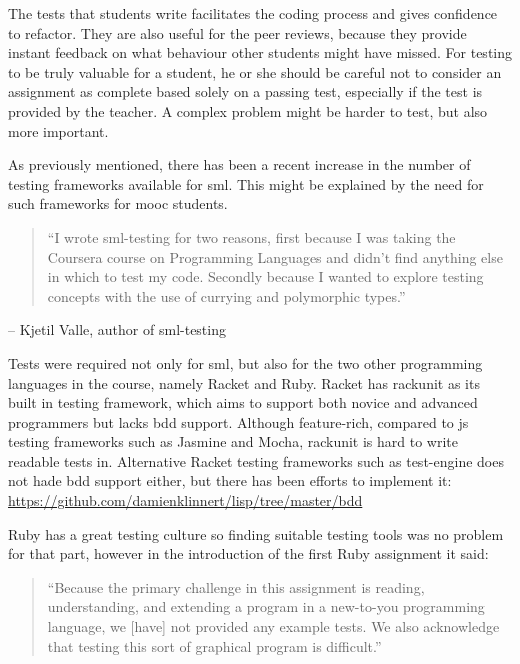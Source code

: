 \documentclass[11pt]{article}
\begin{document}
The tests that students write facilitates the coding process and gives confidence to refactor.
They are also useful for the peer reviews, because they provide instant feedback on what behaviour other students might have missed.
For testing to be truly valuable for a student, he or she should be careful not to consider an assignment as complete based solely on a passing test, especially if the test is provided by the teacher.
A complex problem might be harder to test, but also more important.

As previously mentioned, there has been a recent increase in the number of testing frameworks available for \gls{sml}. This might be explained by the need for such frameworks for \gls{mooc} students.

\begin{quote}
``I wrote sml-testing for two reasons, first because I was taking the Coursera course on Programming Languages and didn't find anything else in which to test my code. Secondly because I wanted to explore testing concepts with the use of currying and polymorphic types.''
\end{quote}

-- Kjetil Valle, author of sml-testing

Tests were required not only for \gls{sml}, but also for the two other programming languages in the course, namely Racket and Ruby.
Racket has rackunit as its built in testing framework, which aims to support both novice and advanced programmers but lacks \gls{bdd} support.
Although feature-rich, compared to \gls{js} testing frameworks such as Jasmine and Mocha, rackunit is hard to write readable tests in.
Alternative Racket testing frameworks such as test-engine does not hade \gls{bdd} support either, but there has been efforts to implement it: \url{https://github.com/damienklinnert/lisp/tree/master/bdd}

Ruby has a great testing culture so finding suitable testing tools was no problem for that part, however in the introduction of the first Ruby assignment it said:

\begin{quote}
``Because the primary challenge in this assignment is reading, understanding, and extending a program in a new-to-you programming language, we [have] not provided any example tests. We also acknowledge that testing this sort of graphical program is difficult.''
\end{quote}
\end{document}
